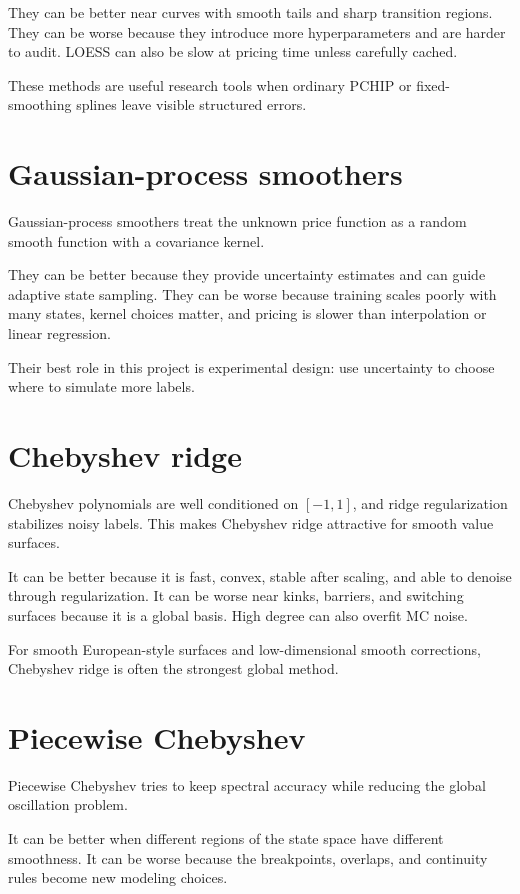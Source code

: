 \documentclass[11pt,oneside]{book}
\theoremstyle{definition}
\begin{document}
They can be better near curves with smooth tails and sharp transition regions.
They can be worse because they introduce more hyperparameters and are harder to
audit. LOESS can also be slow at pricing time unless carefully cached.

These methods are useful research tools when ordinary PCHIP or fixed-smoothing
splines leave visible structured errors.

\section{Gaussian-process smoothers}
Gaussian-process smoothers treat the unknown price function as a random smooth
function with a covariance kernel.

They can be better because they provide uncertainty estimates and can guide
adaptive state sampling. They can be worse because training scales poorly with
many states, kernel choices matter, and pricing is slower than interpolation or
linear regression.

Their best role in this project is experimental design: use uncertainty to
choose where to simulate more labels.

\section{Chebyshev ridge}
Chebyshev polynomials are well conditioned on \([-1,1]\), and ridge
regularization stabilizes noisy labels. This makes Chebyshev ridge attractive
for smooth value surfaces.

It can be better because it is fast, convex, stable after scaling, and able to
denoise through regularization. It can be worse near kinks, barriers, and
switching surfaces because it is a global basis. High degree can also overfit
MC noise.

For smooth European-style surfaces and low-dimensional smooth corrections,
Chebyshev ridge is often the strongest global method.

\section{Piecewise Chebyshev}
Piecewise Chebyshev tries to keep spectral accuracy while reducing the global
oscillation problem.

It can be better when different regions of the state space have different
smoothness. It can be worse because the breakpoints, overlaps, and continuity
rules become new modeling choices.
\end{document}
